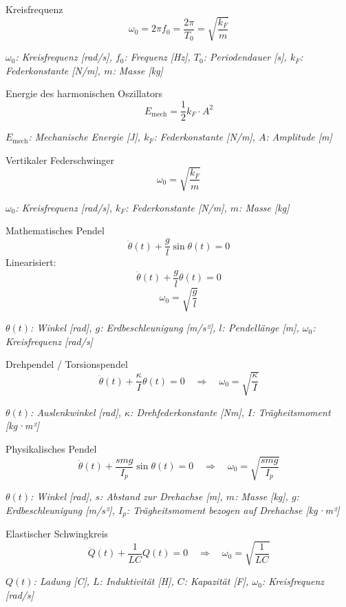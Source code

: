 \documentclass[a5paper,10pt]{article}
\newenvironment{displayformula}
{
	\begin{framed}
		\color{formulaColor}
	}
	{\end{framed}}
\newcommand{\formulalegend}[1]{%
	\par\vspace{0.5ex}%
	{{\color{legendColor}\RaggedRight\small\textit{#1}}}%
	\par\vspace{1.5ex}%
}
\begin{document}
\begin{displayformula}
	Kreisfrequenz
	\[
	\omega_0 = 2\pi f_0 = \frac{2\pi}{T_0} = \sqrt{\frac{k_F}{m}}
	\]
\end{displayformula}
\formulalegend{
	\( \omega_0 \): Kreisfrequenz [rad/s], \( f_0 \): Frequenz [Hz], \( T_0 \): Periodendauer [s], \( k_F \): Federkonstante [N/m], \( m \): Masse [kg]
}

\begin{displayformula}
	Energie des harmonischen Oszillators
	\[
	E_{\text{mech}} = \frac{1}{2} k_F \cdot A^2
	\]
\end{displayformula}
\formulalegend{
	\( E_{\text{mech}} \): Mechanische Energie [J], \( k_F \): Federkonstante [N/m], \( A \): Amplitude [m]
}

\begin{displayformula}
	Vertikaler Federschwinger
	\[
	\omega_0 = \sqrt{\frac{k_F}{m}}
	\]
\end{displayformula}
\formulalegend{
	\( \omega_0 \): Kreisfrequenz [rad/s], \( k_F \): Federkonstante [N/m], \( m \): Masse [kg]
}

\begin{displayformula}
	Mathematisches Pendel
	\[
	\ddot{\theta}(t) + \frac{g}{l} \sin\theta(t) = 0
	\]
	Linearisiert:
	\[
	\ddot{\theta}(t) + \frac{g}{l} \theta(t) = 0
	\]
	\[
	\omega_0 = \sqrt{\frac{g}{l}}
	\]
\end{displayformula}
\formulalegend{
	\( \theta(t) \): Winkel [rad], \( g \): Erdbeschleunigung [m/s²], \( l \): Pendellänge [m], \( \omega_0 \): Kreisfrequenz [rad/s]
}

\begin{displayformula}
	Drehpendel / Torsionspendel
	\[
	\ddot{\theta}(t) + \frac{\kappa}{I} \theta(t) = 0
	\quad \Rightarrow \quad \omega_0 = \sqrt{\frac{\kappa}{I}}
	\]
\end{displayformula}
\formulalegend{
	\( \theta(t) \): Auslenkwinkel [rad], \( \kappa \): Drehfederkonstante [Nm], \( I \): Trägheitsmoment [kg·m²]
}

\begin{displayformula}
	Physikalisches Pendel
	\[
	\ddot{\theta}(t) + \frac{s m g}{I_p} \sin\theta(t) = 0
	\quad \Rightarrow \quad \omega_0 = \sqrt{\frac{s m g}{I_p}}
	\]
\end{displayformula}
\formulalegend{
	\( \theta(t) \): Winkel [rad], \( s \): Abstand zur Drehachse [m], \( m \): Masse [kg], \( g \): Erdbeschleunigung [m/s²], \( I_p \): Trägheitsmoment bezogen auf Drehachse [kg·m²]
}

\begin{displayformula}
	Elastischer Schwingkreis
	\[
	\ddot{Q}(t) + \frac{1}{LC} Q(t) = 0
	\quad \Rightarrow \quad \omega_0 = \sqrt{\frac{1}{LC}}
	\]
\end{displayformula}
\formulalegend{
	\( Q(t) \): Ladung [C], \( L \): Induktivität [H], \( C \): Kapazität [F], \( \omega_0 \): Kreisfrequenz [rad/s]
}
\newpage
\end{document}
